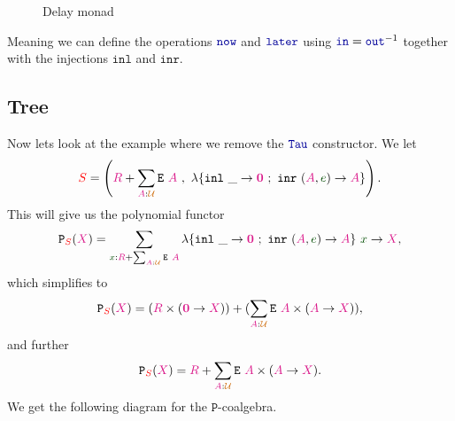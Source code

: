 \documentclass[twoside,11pt,openright]{report}
\theoremstyle{plain} %
\theoremstyle{definition}
\theoremstyle{remark}
\newcommand*{\term}[1]{\textcolor{green!30!black}{#1}} %
\newcommand*{\type}[1]{\textcolor{magenta!90!black}{#1}}
\newcommand*{\container}[1]{\textcolor{red}{#1}}
\newcommand*{\universe}[1]{\textcolor{orange!80!black}{#1}}
\newcommand*{\empt}{\type{\textbf{0}}}
\newcommand*{\function}[1]{\textcolor{blue!60!black}{\ensuremath{\mathtt{#1}}}}
\newcommand*{\typeformer}[1]{\ensuremath{\mathtt{#1}}}
\newcommand*{\functor}[1]{\ensuremath{\mathbf{\mathtt{#1}}}}
\begin{document}
\begin{figure}[h]
  \centering
  \caption{Delay monad}
\end{figure}
\noindent Meaning we can define the operations \(\function{now}\) and \(\function{later}\) using \(\function{in} = \function{out}^{-1}\) together with the injections \(\mathtt{inl}\) and \(\mathtt{inr}\). 

\subsection{Tree}
Now lets look at the example where we remove the \(\function{Tau}\) constructor. We let
\begin{equation}
  \container{S} = \left(\type{R} + \sum_{\type{A} : \universe{\mathcal{U}}} \typeformer{E}~\type{A}~,~\lambda \{ \texttt{inl}~\_ \rightarrow \empt ~;~ \texttt{inr}~(\type{A},\term{e}) \rightarrow \type{A} \} \right).
\end{equation}
This will give us the polynomial functor
\begin{equation}
  \functor{P}_{\container{S}}(\type{X}) = \sum_{\term{x} : \type{R} + \sum_{\type{A} : \universe{\mathcal{U}}} \typeformer{E}~\type{A}} \lambda \{ \texttt{inl}~\_ \rightarrow \empt ~;~ \texttt{inr}~(\type{A},\term{e}) \rightarrow \type{A} \}~\term{x} \rightarrow \type{X},
\end{equation}
which simplifies to
\begin{equation}
  \functor{P}_{\container{S}}(\type{X}) = (\type{R} \times (\empt \rightarrow \type{X})) + (\sum_{\type{A} : \universe{\mathcal{U}}} \typeformer{E}~\type{A} \times (\type{A} \rightarrow \type{X})),
\end{equation}
and further
\begin{equation}
  \functor{P}_{\container{S}}(\type{X}) = \type{R} + \sum_{\type{A} : \universe{\mathcal{U}}} \typeformer{E}~\type{A} \times (\type{A} \rightarrow \type{X}).
\end{equation}
We get the following diagram for the \(\functor{P}\)-coalgebra.
\end{document}
